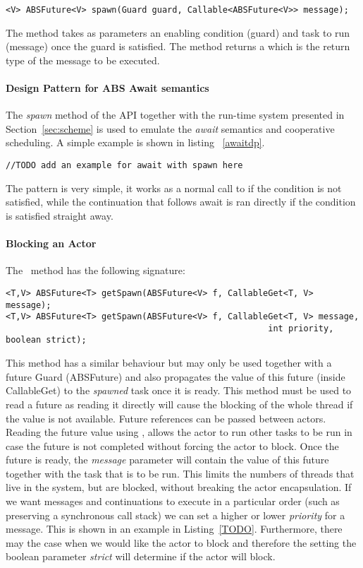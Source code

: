 \begin{lstlisting}
<V> ABSFuture<V> spawn(Guard guard, Callable<ABSFuture<V>> message);
\end{lstlisting}

 The method takes as parameters an enabling condition (guard) and task to run (message) once the guard is satisfied. The method returns a \future which is the return type of the message to be executed. 

\paragraph{Design Pattern for ABS Await semantics}
The \textit{spawn} method of the API together with the run-time system presented in Section~\ref{sec:scheme} is used to emulate the \textit{await} semantics and cooperative scheduling. A simple example is shown in listing ~\ref{awaitdp}. 

\begin{lstlisting}[caption= ABS Await Design Pattern, label=awaitdp]
//TODO add an example for await with spawn here
\end{lstlisting}

The pattern is very simple, it works as a normal call to \spawn if the condition is not satisfied, while the continuation that follows await is ran directly if the condition is satisfied straight away.


\paragraph{Blocking an Actor}
The \gspawn ~method has the following signature:

\begin{lstlisting}
<T,V> ABSFuture<T> getSpawn(ABSFuture<V> f, CallableGet<T, V> message);
<T,V> ABSFuture<T> getSpawn(ABSFuture<V> f, CallableGet<T, V> message, 
													int priority, boolean strict);
\end{lstlisting}

This method has a similar behaviour \spawn but may only be used together with a future Guard (ABSFuture) and also propagates the value of this future (inside CallableGet) to the \textit{spawned} task once it is ready. This method must be used to read a future as reading it directly will cause the blocking of the whole thread if the value is not available.  Future references can be passed between actors. Reading the future value using \gspawn, allows the actor to run other tasks to be run in case the future is not completed without forcing the actor to block. Once the future is ready, the \textit{message} parameter will contain the value of this future together with the task that is to be run. This limits the numbers of threads that live in the system, but are blocked, without breaking the actor encapsulation. If we want messages and continuations to execute in a particular order (such as preserving a synchronous call stack) we can set a higher or lower \textit{priority} for a message. This is shown in an example in Listing~\ref{TODO}. Furthermore, there may the case when we would like the actor to block and therefore the setting the boolean parameter \textit{strict} will determine if the actor will block.  

